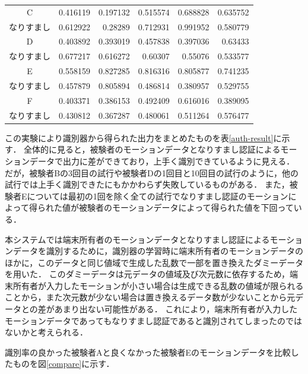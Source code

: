\begin{table}[btph]
\begin{tabular}{|c|r|r|r|r|r|}
    C & 0.416119 & 0.197132 & 0.515574 & 0.688828 & 0.635752 \\
    なりすまし & 0.612922 & 0.28289 & 0.712931 & 0.991952 & 0.580779 \\ \hline
    D & 0.403892 & 0.393019 & 0.457838 & 0.397036 & 0.63433 \\
    なりすまし & 0.677217 & 0.616272 & 0.60307 & 0.55076 & 0.533577 \\ \hline
    E & 0.558159 & 0.827285 & 0.816316 & 0.805877 & 0.741235 \\
    なりすまし & 0.457879 & 0.805894 & 0.486814 & 0.380957 & 0.529755 \\ \hline
    F & 0.403371 & 0.386153 & 0.492409 & 0.616016 & 0.389095 \\
    なりすまし & 0.430812 & 0.367287& 0.480061 & 0.511264 & 0.576477 \\ \hline
  \end{tabular}
\end{table}

この実験により識別器から得られた出力をまとめたものを表\ref{auth-result}に示す．
全体的に見ると，被験者のモーションデータとなりすまし認証によるモーションデータで出力に差ができており，上手く識別できているように見える．
だが，被験者Bの3回目の試行や被験者Dの1回目と10回目の試行のように，他の試行では上手く識別できたにもかかわらず失敗しているものがある．
また，被験者Eについては最初の1回を除く全ての試行でなりすまし認証のモーションによって得られた値が被験者のモーションデータによって得られた値を下回っている．


本システムでは端末所有者のモーションデータとなりすまし認証によるモーションデータを識別するために，識別器の学習時に端末所有者のモーションデータのほかに，このデータと同じ値域で生成した乱数で一部を置き換えたダミーデータを用いた．
このダミーデータは元データの値域及び次元数に依存するため，端末所有者が入力したモーションが小さい場合は生成できる乱数の値域が限られることから，また次元数が少ない場合は置き換えるデータ数が少ないことから元データとの差があまり出ない可能性がある．
これにより，端末所有者が入力したモーションデータであってもなりすまし認証であると識別されてしまったのではないかと考えられる．

識別率の良かった被験者Aと良くなかった被験者Eのモーションデータを比較したものを図\ref{compare}に示す．

